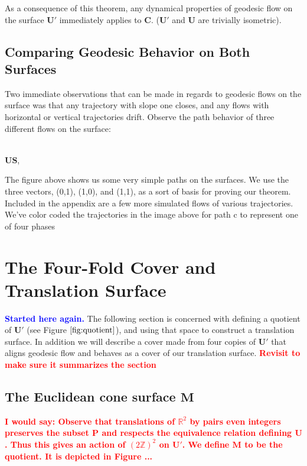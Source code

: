 \documentclass[]{article}
\newcommand{\compav}[1]{\textbf{\textcolor{blue}{#1}}}
\newcommand{\compat}[1]{\textbf{\textcolor{red}{#1}}}
\begin{document}
As a consequence of this theorem, any dynamical properties of geodesic flow on the surface $\mathbf{U}'$ immediately applies to $\mathbf{C}$. ($\mathbf{U}'$ and $\mathbf{U}$ are trivially isometric).

\subsection{Comparing Geodesic Behavior on Both Surfaces}
Two immediate observations that can be made in regards to geodesic flows on the surface was that any trajectory with slope one closes, and any flows with horizontal or vertical trajectories drift. Observe the path behavior of three different flows on the surface:

\begin{center}
\hspace{0.1in}
\raisebox{0.5in}{}
\\ $\mathbf{U}$$\mathbf{S}$,
\\ 
\end{center}

The figure above shows us some very simple paths on the surfaces. We use the three vectors, (0,1), (1,0), and (1,1), as a sort of basis for proving our theorem. Included in the appendix are a few more simulated flows of various trajectories. We've color coded the trajectories in the image above for path c to represent one of four phases

\newpage
\section{The Four-Fold Cover and Translation Surface}
\compav{Started here again.}
The following section is concerned with defining a quotient of $\mathbf{U}'$ (see Figure $\ref{fig:quotient}$), and using that space to construct a translation surface. In addition we will describe a cover made from four copies of $\mathbf{U}'$ that aligns geodesic flow and behaves as a cover of our translation surface. \compat{Revisit to make sure it summarizes the section}

\subsection{The Euclidean cone surface $\mathbf{M}$}
\compat{I would say: Observe that translations of ${\mathbb R}^2$ by pairs even integers preserves the subset ${\mathbf P}$ and respects the equivalence relation defining ${\mathbf U}$. Thus this gives an action of $(2{\mathbb Z})^2$ on ${\mathbf U}'$. We define ${\mathbf M}$ to be the quotient. It is depicted in Figure ...}
\end{document}
